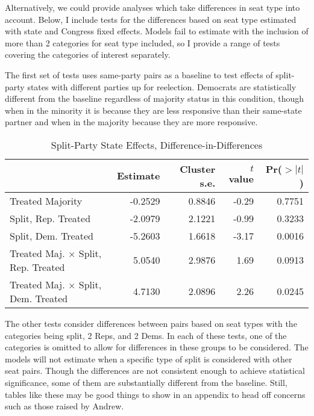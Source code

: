 \documentclass[12pt]{article}
\begin{document}
Alternatively, we could provide analyses which take differences in seat type into account. Below, I include tests for the differences based on seat type estimated with state and Congress fixed effects. Models fail to estimate with the inclusion of more than 2 categories for seat type included, so I provide a range of tests covering the categories of interest separately. 

The first set of tests uses same-party pairs as a baseline to test effects of split-party states with different parties up for reelection. Democrats are statistically different from the baseline regardless of majority status in this condition, though when in the minority it is because they are less responsive than their same-state partner and when in the majority because they are more responsive.

\begin{table}[H]
	\centering
	\caption{Split-Party State Effects, Difference-in-Differences} 
	\begin{tabular}{lrrrr}
		\hline
		& Estimate & Cluster s.e. & $t$ value & Pr($>|t|$) \\ 
		\hline
		Treated Majority & -0.2529 & 0.8846 & -0.29 & 0.7751 \\ 
		Split, Rep. Treated & -2.0979 & 2.1221 & -0.99 & 0.3233 \\ 
		Split, Dem. Treated & -5.2603 & 1.6618 & -3.17 & 0.0016 \\ 
		Treated Maj. $ \times $ Split, Rep. Treated & 5.0540 & 2.9876 & 1.69 & 0.0913 \\ 
		Treated Maj. $ \times $ Split, Dem. Treated & 4.7130 & 2.0896 & 2.26 & 0.0245 \\ 
		\hline
	\end{tabular}
\end{table}

The other tests consider differences between pairs based on seat types with the categories being split, 2 Reps, and 2 Dems. In each of these tests, one of the categories is omitted to allow for differences in these groups to be considered. The models will not estimate when a specific type of split is considered with other seat pairs. Though the differences are not consistent enough to achieve statistical significance, some of them are substantially different from the baseline. Still, tables like these may be good things to show in an appendix to head off concerns such as those raised by Andrew.
\end{document}
